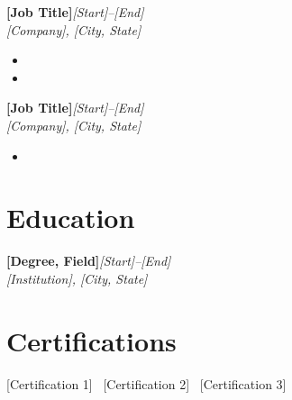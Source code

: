 \documentclass[10.5pt,letterpaper]{article}
\newcommand{\cvheader}[3]{%
  \noindent\textbf{#1}\hfill\textit{#3}\\
  \textit{#2}
}
\begin{document}
\vspace{4pt}
\cvheader{[Job Title]}{[Company], [City, State]}{[Start]--[End]}
\begin{itemize}
  \item [Achievement or responsibility]
  \item [Achievement or responsibility]
\end{itemize}

\vspace{4pt}
\cvheader{[Job Title]}{[Company], [City, State]}{[Start]--[End]}
\begin{itemize}
  \item [Achievement or responsibility]
\end{itemize}

\section{Education}
\cvheader{[Degree, Field]}{[Institution], [City, State]}{[Start]--[End]}

\section{Certifications}
[Certification 1] \textbar\ [Certification 2] \textbar\ [Certification 3]
\end{document}
